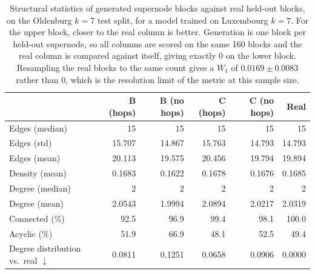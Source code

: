 \begin{table}[H]
\centering
\caption{Structural statistics of generated supernode blocks against real
held-out blocks, on the Oldenburg $k{=}7$ test split, for a model trained on
Luxembourg $k{=}7$. For the upper block, closer to the real column is
better. Generation is one block per held-out supernode, so all columns are
scored on the same 160 blocks and the real column is compared against
itself, giving exactly $0$ on the lower block. Resampling the real blocks to
the same count gives a $W_1$ of $0.0169 \pm 0.0083$ rather
than $0$, which is the resolution limit of the metric at this sample size.}
\label{tab:dintra-lux2olde-k7-stats}
\begin{tabular}{lrrrrr}
\toprule
 & B (hops) & B (no hops) & C (hops) & C (no hops) & Real \\
\midrule
Edges (median)                     & 15 & 15 & 15 & 15 & 15 \\
Edges (std)                        & 15.707 & 14.867 & 15.763 & 14.793 & 14.793 \\
Edges (mean)                       & 20.113 & 19.575 & 20.456 & 19.794 & 19.894 \\
Density (mean)                     & 0.1683 & 0.1622 & 0.1678 & 0.1676 & 0.1685 \\
Degree (median)                    & 2 & 2 & 2 & 2 & 2 \\
Degree (mean)                      & 2.0543 & 1.9994 & 2.0894 & 2.0217 & 2.0319 \\
Connected (\%)                     & 92.5 & 96.9 & 99.4 & 98.1 & 100.0 \\
Acyclic (\%)                       & 51.9 & 66.9 & 48.1 & 52.5 & 49.4 \\
\midrule
Degree distribution vs.\ real $\downarrow$ & 0.0811 & 0.1251 & 0.0658 & 0.0906 & 0.0000 \\
\bottomrule
\end{tabular}
\end{table}
